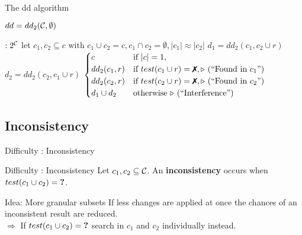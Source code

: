 \begin{frame}{The dd algorithm}


	$dd = dd_2(\mathcal{C}, \emptyset)$ \\[1.5em]

	\begin{algorithmic}[1]
		 $: 2^{\mathcal{C}}$
		\State let $c_1,c_2 \subseteq c \text{ with } c_1 \cup c_2 = c, c_1 \cap c_2 = \emptyset, |c_1| \approx |c_2|$
		\State $d_1 = dd_2(c_1, c_2 \cup r)$ %
		\State $d_2 = dd_2(c_2, c_1 \cup r)$ \medskip %
		\State \Return $ \begin{cases}
				c & \text{if } |c|=1, \\
				dd_2(c_1,r) & \text{if } test(c_1 \cup r) = \xmark, \text{\Comment(``Found in $c_1$'')}\\
				dd_2(c_2,r) & \text{if } test(c_2 \cup r) = \xmark, \text{\Comment(``Found in $c_2$'')}\\
				d_1 \cup d_2 & \text{otherwise } \text{\Comment(``Interference'')}
			\end{cases}$
		\EndFunction
	\end{algorithmic}

\end{frame}

\subsection{Inconsistency}
\begin{frame}{Difficulty : Inconsistency}

	\begin{alertblock}{Difficulty : Inconsistency}
		Let $c_1,c_2 \subseteq \mathcal{C}$. An \textbf{inconsistency} occurs when $test(c_1 \cup c_2) = \textbf{?}$.
	\end{alertblock}
	\bigskip

	\pause
	\begin{exampleblock}{Idea: More granular subsets}
		If less changes are applied at once the chances of an inconsistent result are reduced. \\[.5em]

		$\Rightarrow$ If $test(c_1 \cup c_2) = \textbf{?}$ search in $c_1$ and $c_2$ individually instead.
	\end{exampleblock}

\end{frame}

